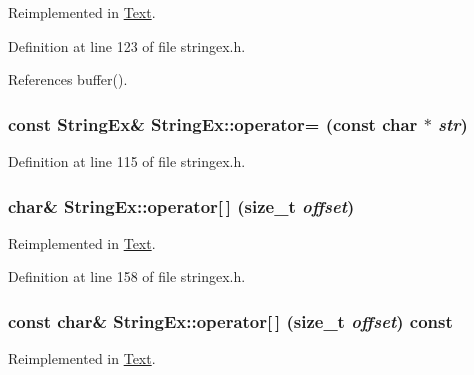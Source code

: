 Reimplemented in \hyperlink{classText_c5bed8a0fa6cc15e69fd3f3a6072e6ae}{Text}.

Definition at line 123 of file stringex.h.

References buffer().\hypertarget{classStringEx_9bf02ac98235d7041562939b87512bac}{
\subsubsection[{operator=}]{\setlength{\rightskip}{0pt plus 5cm}const {\bf StringEx}\& StringEx::operator= (const char $\ast$ {\em str})}}
\label{classStringEx_9bf02ac98235d7041562939b87512bac}




Definition at line 115 of file stringex.h.\hypertarget{classStringEx_bb126ddaf548a3432f55c2dada139f64}{
\subsubsection[{operator[]}]{\setlength{\rightskip}{0pt plus 5cm}char\& StringEx::operator\mbox{[}$\,$\mbox{]} (size\_\-t {\em offset})}}
\label{classStringEx_bb126ddaf548a3432f55c2dada139f64}




Reimplemented in \hyperlink{classText_bccce5d5b11116ac065b910ce8eefe17}{Text}.

Definition at line 158 of file stringex.h.\hypertarget{classStringEx_9d84497552f7c6adfd065bfb4f40f9c2}{
\subsubsection[{operator[]}]{\setlength{\rightskip}{0pt plus 5cm}const char\& StringEx::operator\mbox{[}$\,$\mbox{]} (size\_\-t {\em offset}) const}}
\label{classStringEx_9d84497552f7c6adfd065bfb4f40f9c2}




Reimplemented in \hyperlink{classText_19b861315b5b50504740e3a843eba87b}{Text}.

